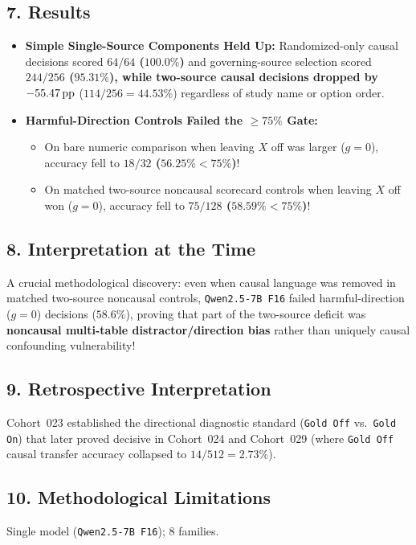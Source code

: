 \subsection*{7. Results}
\begin{itemize}
  \item \textbf{Simple Single-Source Components Held Up:} Randomized-only causal decisions scored \textbf{$64/64$ ($100.0\%$)} and governing-source selection scored \textbf{$244/256$ ($95.31\%$)\textbf{, while two-source causal decisions dropped by }$-55.47\,\mathrm{pp}$} ($114/256 = 44.53\%$) regardless of study name or option order.
  \item \textbf{Harmful-Direction Controls Failed the $\ge 75\%$ Gate:}
    \begin{itemize}
      \item On bare numeric comparison when leaving $X$ off was larger ($g=0$), accuracy fell to \textbf{$18/32$ ($56.25\% < 75\%$)}!
      \item On matched two-source noncausal scorecard controls when leaving $X$ off won ($g=0$), accuracy fell to \textbf{$75/128$ ($58.59\% < 75\%$)}!
    \end{itemize}
\end{itemize}

\subsection*{8. Interpretation at the Time}
A crucial methodological discovery: even when causal language was removed in matched two-source noncausal controls, \texttt{Qwen2.5-7B F16} failed harmful-direction ($g=0$) decisions ($58.6\%$), proving that part of the two-source deficit was \textbf{noncausal multi-table distractor/direction bias} rather than uniquely causal confounding vulnerability!

\subsection*{9. Retrospective Interpretation}
Cohort~023 established the directional diagnostic standard (\texttt{Gold Off} vs.\ \texttt{Gold On}) that later proved decisive in Cohort~024 and Cohort~029 (where \texttt{Gold Off} causal transfer accuracy collapsed to $14/512 = 2.73\%$).

\subsection*{10. Methodological Limitations}
Single model (\texttt{Qwen2.5-7B F16}); $8$ families.


